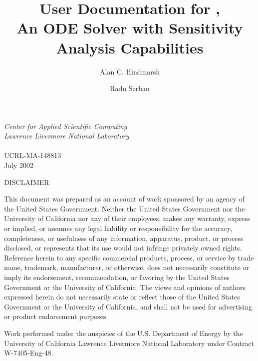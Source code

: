 \documentclass[11pt]{article}
\title{User Documentation for \cvodes, \\ 
An ODE Solver with Sensitivity Analysis Capabilities}
\author{
Alan C. Hindmarsh \and
Radu Serban
}
\date{}
\begin{document}
\maketitle\thispagestyle{empty}
\vfill
\noindent
{\large\em Center for Applied Scientific Computing} \\
{\large\em Lawrence Livermore National Laboratory}\\
\vspace{0.1in}\\
UCRL-MA-148813\\
July 2002
\newpage\thispagestyle{empty}
\begin{center}
\begin{minipage}{6.0in}
\centerline{DISCLAIMER}
This document was prepared as an account of work sponsored by an
agency of the United States Government.
Neither the United States Government nor the University of California
nor any of their employees, makes any warranty, express or implied, or
assumes any legal liability or responsibility for the accuracy,
completeness, or usefulness of any information, apparatus, product, or
process disclosed, or represents that its use would not infringe
privately owned rights.
Reference herein to any specific commercial products, process, or
service by trade name, trademark, manufacturer, or otherwise, does not
necessarily constitute or imply its endorsement, recommendation, or
favoring by the United States Government or the University of
California.
The views and opinions of authors expressed herein do not necessarily
state or reflect those of the United States Government or the
University of California, and shall not be used for advertising or
product endorsement purposes.  

\vspace*{0.2in}

Work performed under the auspicies of the U.S. Department of Energy by the 
University of California Lawrence Livermore National Laboratory under Contract W-7405-Eng-48.
\par\vspace*{1.0in}
\end{minipage}
\end{center}

\newpage\pagestyle{plain}
\tableofcontents
\newpage
\listoftables
\newpage
\listoffigures

\newpage\thispagestyle{empty}\vspace*{1in}
\end{document}
